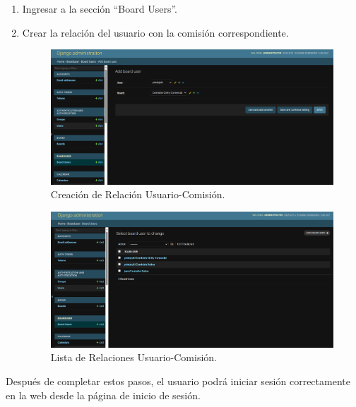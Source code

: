 \begin{enumerate}
    \item Ingresar a la sección ``Board Users''.
    \item Crear la relación del usuario con la comisión correspondiente.

    \begin{figure}[H]
        \centering
        \includegraphics[width=1\linewidth]{fig/board-user.png}
        \caption{Creación de Relación Usuario-Comisión.}
        \label{fig:board-user}
    \end{figure}
    
    \begin{figure}[H]
        \centering
        \includegraphics[width=1\linewidth]{fig/board-user-2.png}
        \caption{Lista de Relaciones Usuario-Comisión.}
        \label{fig:board-user-2}
    \end{figure}
\end{enumerate}

Después de completar estos pasos, el usuario podrá iniciar sesión correctamente en la web desde la página de inicio de sesión.

